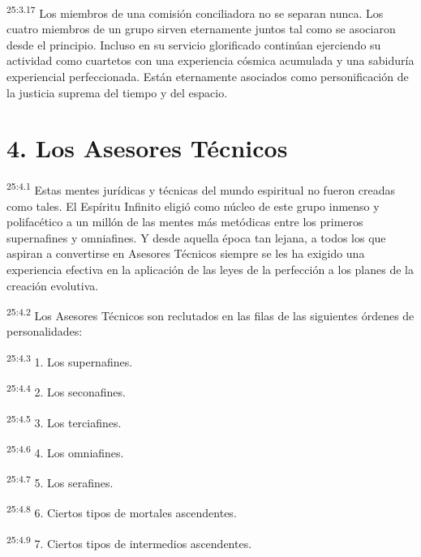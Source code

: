 \par
\textsuperscript{25:3.17} Los miembros de una comisión conciliadora no se separan nunca. Los cuatro miembros de un grupo sirven eternamente juntos tal como se asociaron desde el principio. Incluso en su servicio glorificado continúan ejerciendo su actividad como cuartetos con una experiencia cósmica acumulada y una sabiduría experiencial perfeccionada. Están eternamente asociados como personificación de la justicia suprema del tiempo y del espacio.

\section*{4. Los Asesores Técnicos}
\par
\textsuperscript{25:4.1} Estas mentes jurídicas y técnicas del mundo espiritual no fueron creadas como tales. El Espíritu Infinito eligió como núcleo de este grupo inmenso y polifacético a un millón de las mentes más metódicas entre los primeros supernafines y omniafines. Y desde aquella época tan lejana, a todos los que aspiran a convertirse en Asesores Técnicos siempre se les ha exigido una experiencia efectiva en la aplicación de las leyes de la perfección a los planes de la creación evolutiva.

\par
\textsuperscript{25:4.2} Los Asesores Técnicos son reclutados en las filas de las siguientes órdenes de personalidades:

\par
\textsuperscript{25:4.3} 1. Los supernafines.

\par
\textsuperscript{25:4.4} 2. Los seconafines.

\par
\textsuperscript{25:4.5} 3. Los terciafines.

\par
\textsuperscript{25:4.6} 4. Los omniafines.

\par
\textsuperscript{25:4.7} 5. Los serafines.

\par
\textsuperscript{25:4.8} 6. Ciertos tipos de mortales ascendentes.

\par
\textsuperscript{25:4.9} 7. Ciertos tipos de intermedios ascendentes.


